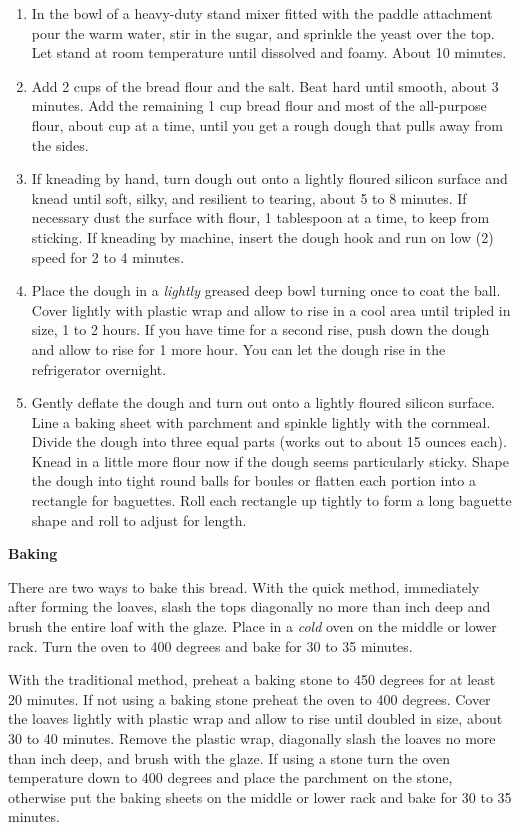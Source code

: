 \documentclass{article}
\begin{document}
\begin{enumerate}
      \item In the bowl of a heavy-duty stand mixer fitted with the paddle
            attachment pour the warm water, stir in the sugar, and sprinkle the
            yeast over the top. Let stand at room temperature until dissolved
            and foamy. About 10 minutes.
      \item Add 2 cups of the bread flour and the salt. Beat hard until smooth,
            about 3 minutes. Add the remaining 1 cup bread flour and most of the
            all-purpose flour, about  cup at a time, until you get a
            rough dough that pulls away from the sides.
      \item If kneading by hand, turn dough out onto a lightly floured silicon
            surface and knead until soft, silky, and resilient to tearing, about
            5 to 8 minutes. If necessary dust the surface with flour, 1 tablespoon
            at a time, to keep from sticking. If kneading by machine, insert the
            dough hook and run on low (2) speed for 2 to 4 minutes.
      \item Place the dough in a \textit{lightly} greased deep bowl turning once
            to coat the ball. Cover lightly with plastic wrap and allow to rise
            in a cool area until tripled in size, 1 to 2 hours. If you
            have time for a second rise, push down the dough and allow to rise
            for 1 more hour. You can let the dough rise in the refrigerator overnight.
      \item Gently deflate the dough and turn out onto a lightly floured silicon surface.
            Line a baking sheet with parchment and spinkle lightly with the cornmeal.
            Divide the dough into three equal parts (works out to about 15
            ounces each). Knead in a little more flour now if the dough seems particularly
            sticky. Shape the dough into tight round balls for boules or flatten each
            portion into a rectangle for baguettes. Roll each rectangle up tightly to
            form a long baguette shape and roll to adjust for length.
\end{enumerate}

\textbf{Baking}

There are two ways to bake this bread. With the quick method, immediately after forming
the loaves, slash the tops diagonally no more than  inch deep and brush
the entire loaf with the glaze. Place in a \textit{cold} oven on the middle or lower rack.
Turn the oven to 400 degrees and bake for 30 to 35 minutes.

With the traditional method, preheat a baking stone to 450 degrees for at least 20 minutes.
If not using a baking stone preheat the oven to 400 degrees. Cover the loaves lightly with
plastic wrap and allow to rise until doubled in size, about 30 to 40 minutes. Remove the
plastic wrap, diagonally slash the loaves no more than  inch deep, and brush
with the glaze. If using a stone turn the oven temperature down to 400 degrees and place
the parchment on the stone, otherwise put the baking sheets on the middle or lower rack and
bake for 30 to 35 minutes.
\end{document}
